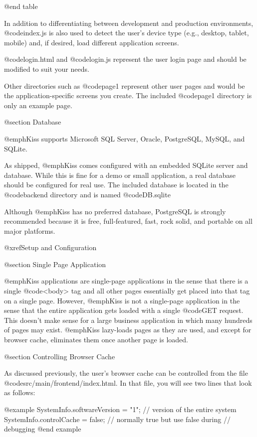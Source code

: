 @end table

In addition to differentiating between development and production environments, @code{index.js}
is also used to detect the user's device type (e.g., desktop, tablet, mobile) and, if desired, 
load different application screens.


@code{login.html} and @code{login.js} represent the user login page
and should be modified to suit your needs.

Other directories such as @code{page1} represent other user pages and
would be the application-specific screens you create.  The included
@code{page1} directory is only an example page.

@section Database

@emph{Kiss} supports Microsoft SQL Server, Oracle, PostgreSQL, MySQL, and
SQLite.

As shipped, @emph{Kiss} comes configured with an embedded SQLite
server and database.  While this is fine for a demo or small
application, a real database should be configured for real use.
The included database is located in the @code{backend} directory
and is named @code{DB.sqlite}

Although @emph{Kiss} has no preferred database, PostgreSQL is strongly
recommended because it is free, full-featured, fast, rock solid, and
portable on all major platforms.

@xref{Setup and Configuration}


@section Single Page Application

@emph{Kiss} applications are single-page applications in the sense
that there is a single @code{<body>} tag and all other pages
essentially get placed into that tag on a single page.  However,
@emph{Kiss} is not a single-page application in the sense that the
entire application gets loaded with a single @code{GET} request.  This
doesn't make sense for a large business application in which many
hundreds of pages may exist.  @emph{Kiss} lazy-loads pages as they are
used, and except for browser cache, eliminates them once another page
is loaded.

@section Controlling Browser Cache

As discussed previously, the user's browser cache can be controlled from the file
@code{src/main/frontend/index.html}. In that file, you will see two lines
that look as follows:

@example
SystemInfo.softwareVersion = "1";  // version of the entire system
SystemInfo.controlCache = false;   // normally true but use false during
                            // debugging
@end example


